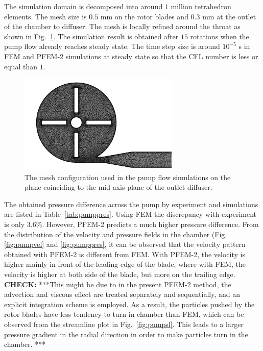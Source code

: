 The simulation domain is decomposed into around $1$ million tetrahedron elements. The mesh size is $0.5$ mm on the rotor blades and $0.3$ mm at the outlet of the chamber to diffuser. The mesh is locally refined around the throat as shown in Fig.~\ref{fig:pumpmesh}. The simulation result is obtained after $15$ rotations when the pump flow already reaches steady state. The time step size is around $10^{-5}$ s in FEM and PFEM-2 simulations at steady state so that the CFL number is less or equal than $1$.  

\begin{figure}[htbp]
    \centering
    \includegraphics[width=3in]{imgs/nozzle_pump/pump_mesh.pdf}
    \caption{The mesh configuration used in the pump flow simulations on the plane coinciding to the mid-axis plane of the outlet diffuser.}
    \label{fig:pumpmesh}
\end{figure}

The obtained pressure difference across the pump by experiment and simulations are listed in Table~\ref{tab:pumppres}. Using FEM the discrepancy with experiment is only $3.6$\%. However, PFEM-2 predicts a much higher pressure difference. From the distribution of the velocity and pressure fields in the chamber (Fig. \ref{fig:pumpvel} and \ref{fig:pumppres}, it can be observed that the velocity pattern obtained with PFEM-2 is different from FEM. With PFEM-2, the velocity is higher mainly in front of the leading edge of the blade, where with FEM, the velocity is higher at both side of the blade, but more on the trailing edge. \textbf{CHECK:} ***This might be due to in the present PFEM-2 method, the advection and viscous effect are treated separately and sequentially, and an explicit integration scheme is employed. As a result, the particles pushed by the rotor blades have less tendency to turn in chamber than FEM, which can be observed from the streamline plot in Fig.~\ref{fig:pumpsl}. This leads to a larger pressure gradient in the radial direction in order to make particles turn in the chamber. ***

